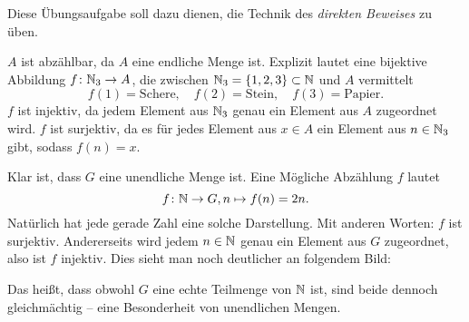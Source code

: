 \documentclass[11pt]{scrartcl}
\begin{document}
\begin{solution}
  Diese Übungsaufgabe soll dazu dienen, die Technik des \emph{direkten Beweises} zu üben.
  \begin{subex}
    \item $A$ ist abzählbar, da $A$ eine endliche Menge ist. 
    Explizit lautet eine bijektive Abbildung $f\colon \mathbb{N}_3 \rightarrow A$, die zwischen $\mathbb{N}_3 = \{1, 2, 3\} \subset \mathbb{N}$ und $A$ vermittelt
    \[
      f(1) = \mathrm{Schere}, \quad f(2) = \mathrm{Stein}, \quad f(3) = \mathrm{Papier}.
    \]
  $f$ ist injektiv, da jedem Element aus $\mathbb{N}_3$ genau ein Element aus $A$ zugeordnet wird.
  $f$ ist surjektiv, da es für jedes Element aus $x \in A$ ein Element aus $n \in \mathbb{N}_3$ gibt, sodass $f(n) = x$.

  \item Klar ist, dass $G$ eine unendliche Menge ist. 
  Eine Mögliche Abzählung $f$ lautet
  \[
    f\colon \mathbb{N} \rightarrow G, n \mapsto f(n) = 2n.
  \]
  Natürlich hat jede gerade Zahl eine solche Darstellung.
  Mit anderen Worten: $f$ ist surjektiv.
  Andererseits wird jedem $n \in \mathbb{N}$ genau ein Element aus $G$ zugeordnet, also ist $f$ injektiv.
  Dies sieht man noch deutlicher an folgendem Bild:

  \begin{center}
  \end{center}

  Das heißt, dass obwohl $G$ eine echte Teilmenge von $\mathbb{N}$ ist, sind beide dennoch gleichmächtig --  eine Besonderheit von unendlichen Mengen.
  \end{subex}
\end{solution}
\end{document}
